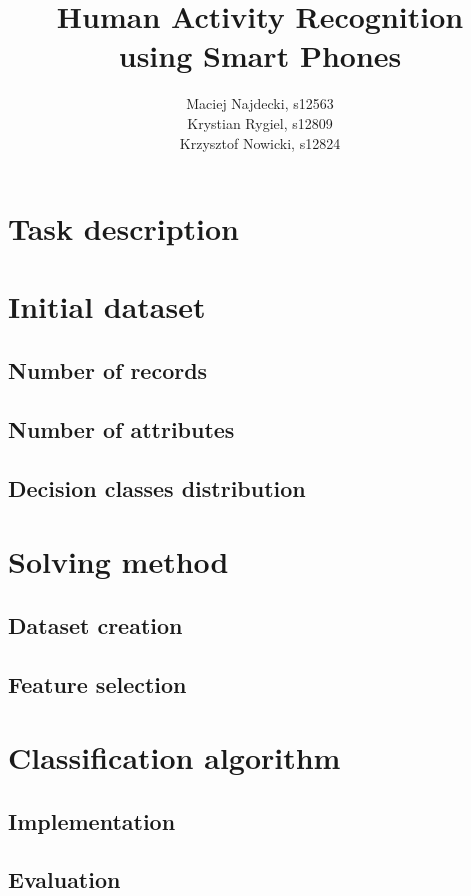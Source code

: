 \documentclass[12pt,a4paper]{article}
\begin{document}
\author{
	Maciej Najdecki, s12563\\
	Krystian Rygiel, s12809\\
	Krzysztof Nowicki, s12824
}
\title{
	Human Activity Recognition\\
	using Smart Phones
}
\maketitle
\newpage

\tableofcontents
\newpage

\section{Task description}

\section{Initial dataset}
\subsection{Number of records}
\subsection{Number of attributes}
\subsection{Decision classes distribution}


\section{Solving method}
\subsection{Dataset creation}
\subsection{Feature selection}

\section{Classification algorithm}
\subsection{Implementation}
\subsection{Evaluation}
\end{document}
